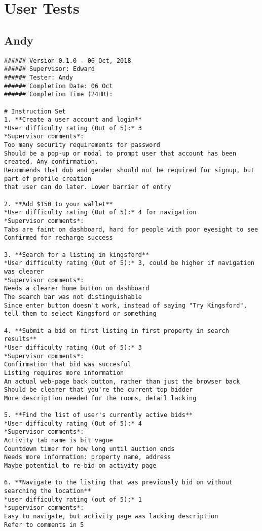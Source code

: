 \section{User Tests}

\subsection{Andy}

\begin{lstlisting}
###### Version 0.1.0 - 06 Oct, 2018
###### Supervisor: Edward
###### Tester: Andy
###### Completion Date: 06 Oct
###### Completion Time (24HR):

# Instruction Set
1. **Create a user account and login**
*User difficulty rating (Out of 5):* 3
*Supervisor comments*:
Too many security requirements for password
Should be a pop-up or modal to prompt user that account has been created. Any confirmation.
Recommends that dob and gender should not be required for signup, but part of profile creation
that user can do later. Lower barrier of entry

2. **Add $150 to your wallet**
*User difficulty rating (Out of 5):* 4 for navigation
*Supervisor comments*:
Tabs are faint on dashboard, hard for people with poor eyesight to see
Confirmed for recharge success

3. **Search for a listing in kingsford**
*User difficulty rating (Out of 5):* 3, could be higher if navigation was clearer
*Supervisor comments*:
Needs a clearer home button on dashboard
The search bar was not distinguishable
Since enter button doesn't work, instead of saying "Try Kingsford", tell them to select Kingsford or something

4. **Submit a bid on first listing in first property in search results**
*User difficulty rating (Out of 5):* 3
*Supervisor comments*:
Confirmation that bid was succesful
Listing requires more information
An actual web-page back button, rather than just the browser back
Should be clearer that you're the current top bidder
More description needed for the rooms, detail lacking

5. **Find the list of user's currently active bids**
*User difficulty rating (Out of 5):* 4
*Supervisor comments*:
Activity tab name is bit vague
Countdown timer for how long until auction ends
Needs more information: property name, address
Maybe potential to re-bid on activity page

6. **Navigate to the listing that was previously bid on without searching the location**
*user difficulty rating (out of 5):* 1
*supervisor comments*:
Easy to navigate, but activity page was lacking description
Refer to comments in 5


\end{lstlisting}
